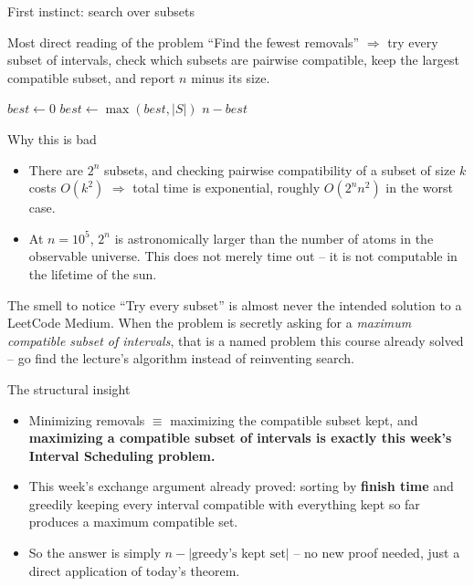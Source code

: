 \documentclass[11pt,aspectratio=169]{beamer}
\begin{document}
\begin{frame}{First instinct: search over subsets}
  \begin{block}{Most direct reading of the problem}
    ``Find the fewest removals'' $\Rightarrow$ try every subset of intervals, check
    which subsets are pairwise compatible, keep the largest compatible subset, and
    report $n$ minus its size.
  \end{block}
  \begin{algorithmic}[1]
    \State $best \gets 0$
        \State $best \gets \max(best, |S|)$
      \EndIf
    \EndFor
    \State \Return $n - best$
  \end{algorithmic}
\end{frame}

\begin{frame}{Why this is bad}
  \begin{itemize}
    \item There are $2^n$ subsets, and checking pairwise compatibility of a subset of
    size $k$ costs $O(k^2)$ $\Rightarrow$ total time is exponential, roughly
    $O(2^n n^2)$ in the worst case.
    \item At $n = 10^5$, $2^n$ is astronomically larger than the number of atoms in the
    observable universe. This does not merely time out -- it is not computable in the
    lifetime of the sun.
  \end{itemize}
  \begin{alertblock}{The smell to notice}
    ``Try every subset'' is almost never the intended solution to a LeetCode Medium.
    When the problem is secretly asking for a \emph{maximum compatible subset of
    intervals}, that is a named problem this course already solved -- go find the
    lecture's algorithm instead of reinventing search.
  \end{alertblock}
\end{frame}

\begin{frame}{The structural insight}
  \begin{itemize}
    \item Minimizing removals $\equiv$ maximizing the compatible subset kept, and
    \textbf{maximizing a compatible subset of intervals is exactly this week's
    Interval Scheduling problem.}
    \item This week's exchange argument already proved: sorting by \textbf{finish
    time} and greedily keeping every interval compatible with everything kept so far
    produces a maximum compatible set.
    \item So the answer is simply $n - |\text{greedy's kept set}|$ -- no new proof
    needed, just a direct application of today's theorem.
  \end{itemize}
\end{frame}
\end{document}
